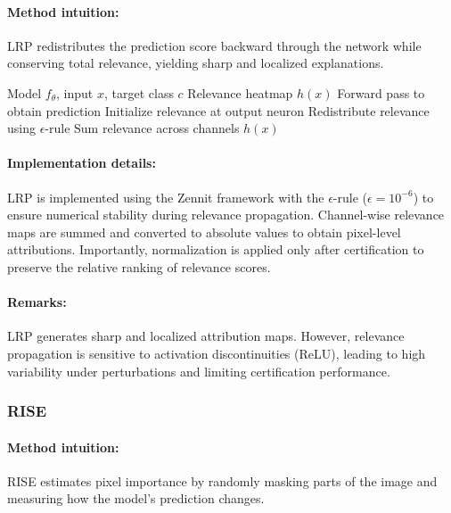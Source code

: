 \documentclass[11pt]{article}
\begin{document}
\paragraph{Method intuition:}
LRP redistributes the prediction score backward through the network while conserving total relevance, yielding sharp and localized explanations.

\begin{algorithm}[H]
\caption{Layer-wise Relevance Propagation (LRP)}
\label{alg:lrp}
\begin{algorithmic}[1]
\REQUIRE Model $f_\theta$, input $x$, target class $c$
\ENSURE Relevance heatmap $h(x)$
\STATE Forward pass to obtain prediction
\STATE Initialize relevance at output neuron
    \STATE Redistribute relevance using $\epsilon$-rule
\ENDFOR
\STATE Sum relevance across channels
\RETURN $h(x)$
\end{algorithmic}
\end{algorithm}

\paragraph{Implementation details:}
LRP is implemented using the Zennit framework with the $\epsilon$-rule ($\epsilon = 10^{-6}$) to ensure numerical stability during relevance propagation. Channel-wise relevance maps are summed and converted to absolute values to obtain pixel-level attributions. Importantly, normalization is applied only after certification to preserve the relative ranking of relevance scores.

\paragraph{Remarks:}
LRP generates sharp and localized attribution maps. However, relevance propagation is sensitive to activation discontinuities (ReLU), leading to high variability under perturbations and limiting certification performance.

\subsubsection{RISE}

\paragraph{Method intuition:}
RISE estimates pixel importance by randomly masking parts of the image and measuring how the model’s prediction changes.
\end{document}
